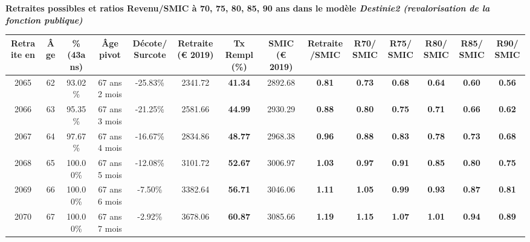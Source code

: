  \vspace{0.1cm} 
{\bf \noindent Retraites possibles et ratios Revenu/SMIC à 70, 75, 80, 85, 90 ans dans le modèle \emph{Destinie2 (revalorisation de la fonction publique)}}  
 
\begin{adjustbox}{max width=\textwidth} 
\begin{tabular}[htb]{|c|c||c|c|c||c|c||c|c||c|c|c|c|c|} 
\hline 
 Retraite en &  Âge &  \%(43ans) &  Âge pivot &  Décote/Surcote &  Retraite (\euro{} 2019) &  Tx Rempl(\%) &  SMIC (\euro{} 2019) &  Retraite/SMIC &  R70/SMIC &  R75/SMIC &  R80/SMIC &  R85/SMIC &  R90/SMIC \\ 
\hline \hline 
 2065 &  62 &  93.02\% &  67 ans 2 mois &  -25.83\% &  2341.72 &  {\bf 41.34} &  2892.68 &  {\bf {\color{red} 0.81}} &  {\bf {\color{red} 0.73}} &  {\bf {\color{red} 0.68}} &  {\bf {\color{red} 0.64}} &  {\bf {\color{red} 0.60}} &  {\bf {\color{red} 0.56}} \\ 
\hline 
 2066 &  63 &  95.35\% &  67 ans 3 mois &  -21.25\% &  2581.66 &  {\bf 44.99} &  2930.29 &  {\bf {\color{red} 0.88}} &  {\bf {\color{red} 0.80}} &  {\bf {\color{red} 0.75}} &  {\bf {\color{red} 0.71}} &  {\bf {\color{red} 0.66}} &  {\bf {\color{red} 0.62}} \\ 
\hline 
 2067 &  64 &  97.67\% &  67 ans 4 mois &  -16.67\% &  2834.86 &  {\bf 48.77} &  2968.38 &  {\bf {\color{red} 0.96}} &  {\bf {\color{red} 0.88}} &  {\bf {\color{red} 0.83}} &  {\bf {\color{red} 0.78}} &  {\bf {\color{red} 0.73}} &  {\bf {\color{red} 0.68}} \\ 
\hline 
 2068 &  65 &  100.00\% &  67 ans 5 mois &  -12.08\% &  3101.72 &  {\bf 52.67} &  3006.97 &  {\bf 1.03} &  {\bf {\color{red} 0.97}} &  {\bf {\color{red} 0.91}} &  {\bf {\color{red} 0.85}} &  {\bf {\color{red} 0.80}} &  {\bf {\color{red} 0.75}} \\ 
\hline 
 2069 &  66 &  100.00\% &  67 ans 6 mois &  -7.50\% &  3382.64 &  {\bf 56.71} &  3046.06 &  {\bf 1.11} &  {\bf 1.05} &  {\bf {\color{red} 0.99}} &  {\bf {\color{red} 0.93}} &  {\bf {\color{red} 0.87}} &  {\bf {\color{red} 0.81}} \\ 
\hline 
 2070 &  67 &  100.00\% &  67 ans 7 mois &  -2.92\% &  3678.06 &  {\bf 60.87} &  3085.66 &  {\bf 1.19} &  {\bf 1.15} &  {\bf 1.07} &  {\bf 1.01} &  {\bf {\color{red} 0.94}} &  {\bf {\color{red} 0.89}} \\ 
\hline 
\hline 
\end{tabular} 
\end{adjustbox} 
 
